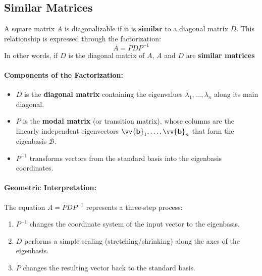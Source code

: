 \documentclass[11pt]{article}
\DeclareRobustCommand{\myvec}[1]{\vv{\mathbf{#1}}}
\newcommand{\myset}[1]{\mathcal{#1}}
\newcommand{\mymat}[1]{#1}
\begin{document}
    \subsection{Similar Matrices}
    A square matrix $\mymat{A}$ is diagonalizable if it is \textbf{similar} to a diagonal matrix $\mymat{D}$.
    This relationship is expressed through the factorization:
    \begin{equation}
        \mymat{A} = \mymat{P}\mymat{D}\mymat{P}^{-1}
    \end{equation}
    In other words, if $\mymat{D}$ is the diagonal matrix of $\mymat{A}$, $\mymat{A}$ and $\mymat{D}$ are \textbf{similar matrices} 
    \paragraph{Components of the Factorization:}
    \begin{itemize}
        \item $\mymat{D}$ is the \textbf{diagonal matrix} containing the eigenvalues $\lambda_1, \dots, \lambda_n$ along its main diagonal.
        \item $\mymat{P}$ is the \textbf{modal matrix} (or transition matrix), whose columns are the linearly independent eigenvectors $\myvec{b}_1, \dots, \myvec{b}_n$ that form the eigenbasis $\myset{B}$.
        \item $\mymat{P}^{-1}$ transforms vectors from the standard basis into the eigenbasis coordinates.
    \end{itemize}

    \paragraph{Geometric Interpretation:}
    The equation $\mymat{A} = \mymat{P}\mymat{D}\mymat{P}^{-1}$ represents a three-step process:
    \begin{enumerate}
        \item $\mymat{P}^{-1}$ changes the coordinate system of the input vector to the eigenbasis.
        \item $\mymat{D}$ performs a simple scaling (stretching/shrinking) along the axes of the eigenbasis.
        \item $\mymat{P}$ changes the resulting vector back to the standard basis.
    \end{enumerate}
\end{document}
